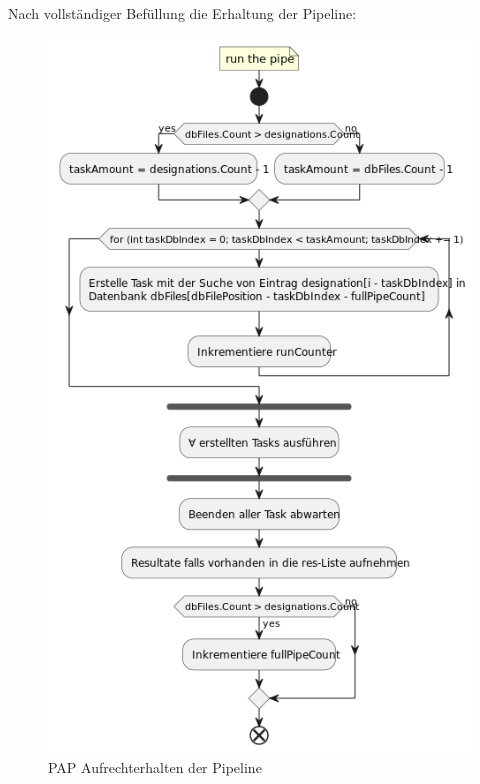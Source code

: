     Nach vollständiger Befüllung die Erhaltung der Pipeline:
    \begin{figure}[H]
        \centering
        \includegraphics[width=\textwidth]{../pap/Case_B.png}
        \caption{\ac{PAP} Aufrechterhalten der Pipeline}
        \label{png:case_b}
    \end{figure}

